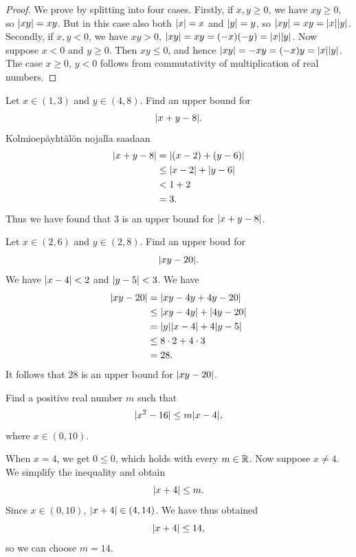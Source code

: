 \documentclass[12pt, a4paper]{article}
\begin{document}
\begin{proof}
  We prove by splitting into four cases. Firstly, if \(x,y \geq 0\), we have
  \(xy \geq 0\), so \(\lvert xy\rvert = xy\). But in this case also both
  \(\lvert x\rvert = x\) and \(\lvert y\rvert = y\), so \(\lvert xy\rvert = xy = \lvert x\rvert\lvert y\rvert\).
  Secondly, if \(x, y < 0\), we have \(xy > 0\),
  \(\lvert xy\rvert = xy = (-x)(-y) = \lvert x\rvert\lvert y\rvert\). Now suppose
  \(x < 0\) and \(y \geq 0\). Then \(xy\leq 0\), and hence
  \(\lvert xy\rvert=-xy=(-x)y=\lvert x\rvert\lvert y\rvert\). The
  case \(x \geq 0\), \(y < 0\) follows from commutativity of multiplication
  of real numbers.
\end{proof}

\begin{example}
  Let \(x \in (1, 3)\) and \(y \in (4, 8)\). Find an upper bound for
  \[\lvert x + y - 8\rvert.\] Kolmioepäyhtälön nojalla saadaan
  \[
    \begin{aligned}
      \lvert x + y - 8\rvert &= \lvert(x - 2) + (y - 6)\rvert \\
      &\leq \lvert x - 2\rvert + \lvert y - 6\rvert \\
      &< 1 + 2 \\
      &= 3.
    \end{aligned}
  \]
  Thus we have found that \(3\) is an upper bound for
  \(\lvert x + y - 8\rvert\).
\end{example}

\begin{example}
  Let \(x \in (2, 6)\) and \(y \in (2, 8)\). Find an upper boud for
  \[\lvert xy - 20\rvert.\]
  We have \(\lvert x - 4\rvert < 2\) and \(\lvert y - 5\rvert < 3\). We have
  \[
    \begin{aligned}
      \lvert xy - 20\rvert &= \lvert xy - 4y + 4y - 20\rvert \\
      &\leq \lvert xy - 4y\rvert + \lvert4y - 20\rvert \\
      &= \lvert y\rvert\lvert x - 4\rvert + 4\lvert y - 5\rvert \\
      &\leq 8 \cdot 2 + 4 \cdot 3 \\
      &= 28.
    \end{aligned}
  \]
  It follows that \(28\) is an upper bound for \(\lvert xy - 20\rvert\).
\end{example}

\begin{example}
  Find a positive real number \(m\) such that
  \[\lvert x^2 - 16\rvert \leq m\lvert x - 4\rvert,\]
  where \(x \in (0, 10)\).

  When \(x = 4\), we get \(0 \leq 0\), which holds with every \(m \in \mathbb{R}\).
  Now suppose \(x \neq 4\). We simplify the inequality and obtain
  \[\lvert x + 4\rvert \leq m.\]
  Since \(x \in (0, 10)\), \(\lvert x + 4\rvert \in (4, 14)\). We have thus obtained
  \[\lvert x + 4\rvert \le 14,\]
  so we can choose \(m = 14\).
\end{example}
\end{document}
